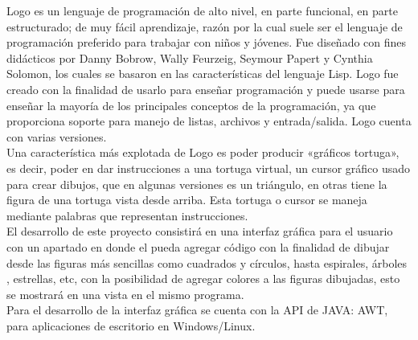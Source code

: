 Logo es un lenguaje de programación de alto nivel, en parte funcional, en parte estructurado; de muy fácil aprendizaje, razón por la cual suele ser el lenguaje de programación preferido para trabajar con niños y jóvenes. Fue diseñado con fines didácticos por Danny Bobrow, Wally Feurzeig, Seymour Papert y Cynthia Solomon, los cuales se basaron en las características del lenguaje Lisp. Logo fue creado con la finalidad de usarlo para enseñar programación y puede usarse para enseñar la mayoría de los principales conceptos de la programación, ya que proporciona soporte para manejo de listas, archivos y entrada/salida. Logo cuenta con varias versiones. \\

Una característica más explotada de Logo es poder producir «gráficos tortuga», es decir, poder en dar instrucciones a una tortuga virtual, un cursor gráfico usado para crear dibujos, que en algunas versiones es un triángulo, en otras tiene la figura de una tortuga vista desde arriba. Esta tortuga o cursor se maneja mediante palabras que representan instrucciones. \\

El desarrollo de este proyecto consistirá en una interfaz gráfica para el usuario con un apartado en donde el pueda agregar código con la finalidad de dibujar desde las figuras más sencillas como cuadrados y círculos, hasta espirales, árboles , estrellas, etc, con la posibilidad de agregar colores a las figuras dibujadas, esto se mostrará en una vista en el mismo programa. \\

Para el desarrollo de la interfaz gráfica se cuenta con la API de JAVA: AWT, para 
aplicaciones de escritorio en Windows/Linux. \\